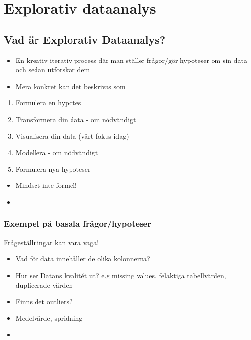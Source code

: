 \documentclass[
]{book}
\providecommand{\tightlist}{%
  \setlength{\itemsep}{0pt}\setlength{\parskip}{0pt}}
\begin{document}
\hypertarget{eda}{%
\chapter{Explorativ dataanalys}\label{eda}}

\hypertarget{vad-uxe4r-explorativ-dataanalys}{%
\section{Vad är Explorativ Dataanalys?}\label{vad-uxe4r-explorativ-dataanalys}}

\begin{itemize}
\item
  En kreativ iterativ process där man ställer frågor/gör hypoteser om sin data och sedan utforskar dem
\item
  Mera konkret kan det beskrivas som
\end{itemize}

\begin{enumerate}
\def\labelenumi{\arabic{enumi}.}
\tightlist
\item
  Formulera en hypotes
\item
  Transformera din data - om nödvändigt
\item
  Visualisera din data (vårt fokus idag)
\item
  Modellera - om nödvändigt
\item
  Formulera nya hypoteser
\end{enumerate}

\begin{itemize}
\item
  Mindset inte formel!
\item
\end{itemize}

\hypertarget{exempel-puxe5-basala-fruxe5gorhypoteser}{%
\subsection{Exempel på basala frågor/hypoteser}\label{exempel-puxe5-basala-fruxe5gorhypoteser}}

Frågeställningar kan vara vaga!

\begin{itemize}
\item
  Vad för data innehåller de olika kolonnerna?
\item
  Hur ser Datans kvalitét ut? e.g missing values, felaktiga tabellvärden, duplicerade värden
\item
  Finns det outliers?
\item
  Medelvärde, spridning
\item
\end{itemize}
\end{document}
